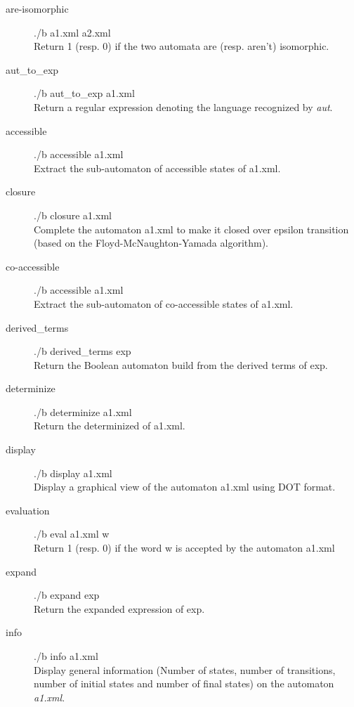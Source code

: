 \begin{description}
  \item [are-isomorphic]
    ./b a1.xml a2.xml\\
    Return 1 (resp. 0) if the two automata are (resp. aren't)
    isomorphic.

  \item [aut\_to\_exp]
    ./b aut\_to\_exp a1.xml\\
    Return a regular expression denoting the language recognized by
    \textit{aut}.

  \item [accessible]
    ./b accessible a1.xml\\
    Extract the sub-automaton of accessible states of a1.xml.

  \item [closure]
    ./b closure a1.xml\\
    Complete the automaton a1.xml to make it
    closed over epsilon transition (based on the
    Floyd-McNaughton-Yamada algorithm).

  \item [co-accessible]
    ./b accessible a1.xml\\
    Extract the sub-automaton of co-accessible states of a1.xml.

  \item [derived\_terms]
    ./b derived\_terms exp\\
    Return the Boolean automaton build from the derived terms of exp.

  \item [determinize]
    ./b determinize a1.xml\\
    Return the determinized of a1.xml.

  \item [display]
    ./b display a1.xml\\
    Display a graphical view of the automaton a1.xml using DOT format.

  \item [evaluation]
    ./b eval a1.xml w\\
    Return 1 (resp. 0) if the word w is accepted by the automaton
    a1.xml

  \item [expand]
    ./b expand exp\\
    Return the expanded expression of exp.

  \item [info]
    ./b info a1.xml\\
    Display general information (Number of states, number of
    transitions, number of initial states and number of final
    states) on the automaton \textit{a1.xml}.


\end{description}
